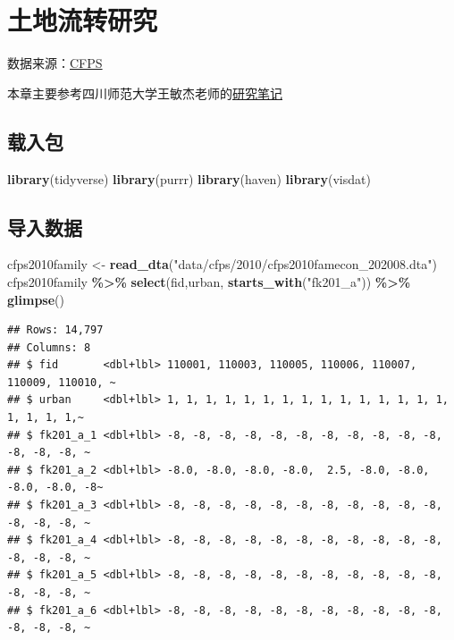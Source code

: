 \documentclass[
]{book}
\newenvironment{Shaded}{\begin{snugshade}}{\end{snugshade}}
\newcommand{\FunctionTok}[1]{\textcolor[rgb]{0.13,0.29,0.53}{\textbf{#1}}}
\newcommand{\NormalTok}[1]{#1}
\newcommand{\OtherTok}[1]{\textcolor[rgb]{0.56,0.35,0.01}{#1}}
\newcommand{\SpecialCharTok}[1]{\textcolor[rgb]{0.81,0.36,0.00}{\textbf{#1}}}
\newcommand{\StringTok}[1]{\textcolor[rgb]{0.31,0.60,0.02}{#1}}
\begin{document}
\hypertarget{ux571fux5730ux6d41ux8f6cux7814ux7a76}{%
\chapter{土地流转研究}\label{ux571fux5730ux6d41ux8f6cux7814ux7a76}}

数据来源：\href{http://www.isss.pku.edu.cn/cfps/index.htm}{CFPS}

本章主要参考四川师范大学王敏杰老师的\href{https://bookdown.org/wangminjie/R4cfps/land.html}{研究笔记}

\hypertarget{ux8f7dux5165ux5305}{%
\section{载入包}\label{ux8f7dux5165ux5305}}

\begin{Shaded}
\begin{Highlighting}[]
\FunctionTok{library}\NormalTok{(tidyverse)}
\FunctionTok{library}\NormalTok{(purrr)}
\FunctionTok{library}\NormalTok{(haven)}
\FunctionTok{library}\NormalTok{(visdat)}
\end{Highlighting}
\end{Shaded}

\hypertarget{ux5bfcux5165ux6570ux636e}{%
\section{导入数据}\label{ux5bfcux5165ux6570ux636e}}

\begin{Shaded}
\begin{Highlighting}[]
\NormalTok{cfps2010family }\OtherTok{\textless{}{-}} \FunctionTok{read\_dta}\NormalTok{(}\StringTok{"data/cfps/2010/cfps2010famecon\_202008.dta"}\NormalTok{)}
\NormalTok{cfps2010family }\SpecialCharTok{\%\textgreater{}\%}
  \FunctionTok{select}\NormalTok{(fid,urban, }\FunctionTok{starts\_with}\NormalTok{(}\StringTok{"fk201\_a"}\NormalTok{)) }\SpecialCharTok{\%\textgreater{}\%}
  \FunctionTok{glimpse}\NormalTok{()}
\end{Highlighting}
\end{Shaded}

\begin{verbatim}
## Rows: 14,797
## Columns: 8
## $ fid       <dbl+lbl> 110001, 110003, 110005, 110006, 110007, 110009, 110010, ~
## $ urban     <dbl+lbl> 1, 1, 1, 1, 1, 1, 1, 1, 1, 1, 1, 1, 1, 1, 1, 1, 1, 1, 1,~
## $ fk201_a_1 <dbl+lbl> -8, -8, -8, -8, -8, -8, -8, -8, -8, -8, -8, -8, -8, -8, ~
## $ fk201_a_2 <dbl+lbl> -8.0, -8.0, -8.0, -8.0,  2.5, -8.0, -8.0, -8.0, -8.0, -8~
## $ fk201_a_3 <dbl+lbl> -8, -8, -8, -8, -8, -8, -8, -8, -8, -8, -8, -8, -8, -8, ~
## $ fk201_a_4 <dbl+lbl> -8, -8, -8, -8, -8, -8, -8, -8, -8, -8, -8, -8, -8, -8, ~
## $ fk201_a_5 <dbl+lbl> -8, -8, -8, -8, -8, -8, -8, -8, -8, -8, -8, -8, -8, -8, ~
## $ fk201_a_6 <dbl+lbl> -8, -8, -8, -8, -8, -8, -8, -8, -8, -8, -8, -8, -8, -8, ~
\end{verbatim}
\end{document}
